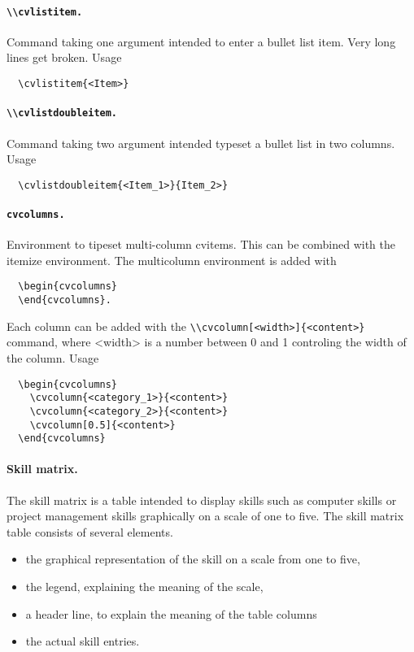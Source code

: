 \documentclass[a4paper,11pt]{article}
\newcommand{\code}[1]{\lstinline!#1!}
\begin{document}
\paragraph{\code{\\cvlistitem.}} Command taking one argument intended to enter a bullet list item.
Very long lines get broken. Usage
\begin{lstlisting}
  \cvlistitem{<Item>}
\end{lstlisting} 

\paragraph{\code{\\cvlistdoubleitem.}} Command taking two argument intended typeset a bullet list in two columns. Usage
\begin{lstlisting}
  \cvlistdoubleitem{<Item_1>}{Item_2>}
\end{lstlisting} 

\paragraph{\code{cvcolumns.}} Environment to tipeset multi-column cvitems. This can be combined with the itemize environment. 
The multicolumn environment is added with 
\begin{lstlisting}
  \begin{cvcolumns}
  \end{cvcolumns}.
\end{lstlisting} 
Each column can be added with the \code{\\cvcolumn[<width>]{<content>}} command, where <width> is a number between 0 and 1 controling the width of the column. 
Usage
\begin{lstlisting}
  \begin{cvcolumns}
    \cvcolumn{<category_1>}{<content>}
    \cvcolumn{<category_2>}{<content>}
    \cvcolumn[0.5]{<content>}
  \end{cvcolumns}
\end{lstlisting} 

\paragraph{Skill matrix.} The skill matrix is a table intended to display skills such as computer skills or project management skills graphically on a scale of one to five. 
The skill matrix table consists of several elements. 
\begin{itemize}
  \item the graphical representation of the skill on a scale from one to five,
  \item the legend, explaining the meaning of the scale,
  \item a header line, to explain the meaning of the table columns 
  \item the actual skill entries.
\end{itemize}\medskip
\end{document}

